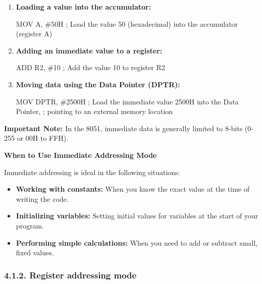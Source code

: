 \documentclass[
]{article}
\newenvironment{Shaded}{}{}
\newcommand{\NormalTok}[1]{#1}
\begin{document}
\begin{enumerate}
\def\labelenumi{\arabic{enumi}.}
\item
  \textbf{Loading a value into the accumulator:}

\begin{Shaded}
\begin{Highlighting}[]
\NormalTok{MOV A, \#50H  ; Load the value 50 (hexadecimal) into the accumulator (register A)}
\end{Highlighting}
\end{Shaded}
\item
  \textbf{Adding an immediate value to a register:}

\begin{Shaded}
\begin{Highlighting}[]
\NormalTok{ADD R2, \#10  ; Add the value 10 to register R2}
\end{Highlighting}
\end{Shaded}
\item
  \textbf{Moving data using the Data Pointer (DPTR):}

\begin{Shaded}
\begin{Highlighting}[]
\NormalTok{MOV DPTR, \#2500H ; Load the immediate value 2500H into the Data Pointer,}
\NormalTok{                  ; pointing to an external memory location}
\end{Highlighting}
\end{Shaded}
\end{enumerate}

\textbf{Important Note:} In the 8051, immediate data is generally
limited to 8-bits (0-255 or 00H to FFH).

\textbf{When to Use Immediate Addressing Mode}

Immediate addressing is ideal in the following situations:

\begin{itemize}
\item
  \textbf{Working with constants:} When you know the exact value at the
  time of writing the code.
\item
  \textbf{Initializing variables:} Setting initial values for variables
  at the start of your program.
\item
  \textbf{Performing simple calculations:} When you need to add or
  subtract small, fixed values.
\end{itemize}

\hypertarget{412-register-addressing-mode}{%
\subsubsection{4.1.2. Register addressing
mode}\label{412-register-addressing-mode}}
\end{document}
